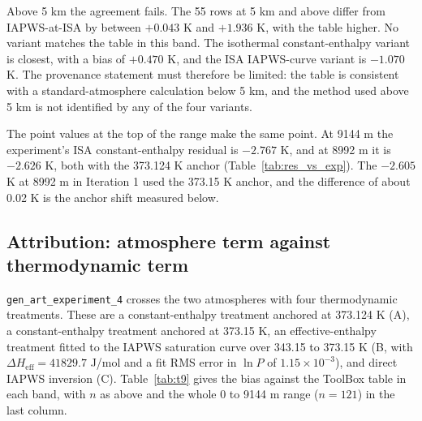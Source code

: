 \documentclass[11pt,letterpaper]{article}
\begin{document}
Above 5 km the agreement fails. The 55 rows at 5 km and above differ from IAPWS-at-ISA by between $+0.043$ K and $+1.936$ K, with the table higher. No variant matches the table in this band. The isothermal constant-enthalpy variant is closest, with a bias of $+0.470$ K, and the ISA IAPWS-curve variant is $-1.070$ K. The provenance statement must therefore be limited: the table is consistent with a standard-atmosphere calculation below 5 km, and the method used above 5 km is not identified by any of the four variants.

The point values at the top of the range make the same point. At 9144 m the experiment's ISA constant-enthalpy residual is $-2.767$ K, and at 8992 m it is $-2.626$ K, both with the 373.124 K anchor (Table~\ref{tab:res_vs_exp}). The $-2.605$ K at 8992 m in Iteration 1 used the 373.15 K anchor, and the difference of about 0.02 K is the anchor shift measured below.

\subsection{Attribution: atmosphere term against thermodynamic term}

\texttt{gen\_art\_experiment\_4} crosses the two atmospheres with four thermodynamic treatments. These are a constant-enthalpy treatment anchored at 373.124 K (A), a constant-enthalpy treatment anchored at 373.15 K, an effective-enthalpy treatment fitted to the IAPWS saturation curve over 343.15 to 373.15 K (B, with $\Delta H_\mathrm{eff} = 41829.7$ J/mol and a fit RMS error in $\ln P$ of $1.15 \times 10^{-3}$), and direct IAPWS inversion (C). Table~\ref{tab:t9} gives the bias against the ToolBox table in each band, with $n$ as above and the whole 0 to 9144 m range ($n = 121$) in the last column.
\end{document}
